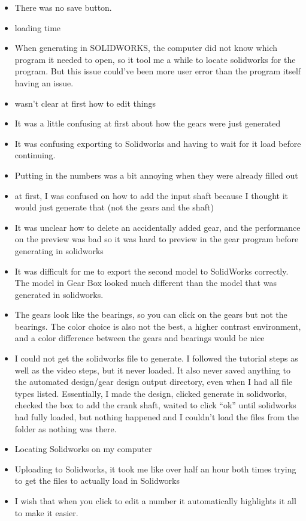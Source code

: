 \begin{itemize}
\item There was no save button.
\item loading time
\item When generating in SOLIDWORKS, the computer did not know which program it needed to open, so it tool me a while to locate solidworks for the program. But this issue could've been more user error than the program itself having an issue.
\item wasn't clear at first how to edit things
\item It was a little confusing at first about how the gears were just generated
\item It was confusing exporting to Solidworks and having to wait for it load before continuing. 
\item Putting in the numbers was a bit annoying when they were already filled out
\item at first, I was confused on how to add the input shaft because I thought it would just generate that (not the gears and the shaft)
\item It was unclear how to delete an accidentally added gear, and the performance on the preview was bad so it was hard to preview in the gear program before generating in solidworks
\item It was difficult for me to export the second model to SolidWorks correctly. The model in Gear Box looked much different than the model that was generated in solidworks. 
\item The gears look like the bearings, so you can click on the gears but not the bearings. The color choice is also not the best, a higher contrast environment, and a color difference between the gears and bearings would be nice
\item I could not get the solidworks file to generate. I followed the tutorial steps as well as the video steps, but it never loaded. It also never saved anything to the automated design/gear design output directory, even when I had all file types listed. Essentially, I made the design, clicked generate in solidworks, checked the box to add the crank shaft, waited to click ``ok'' until solidworks had fully loaded, but nothing happened and I couldn't load the files from the folder as nothing was there.
\item Locating Solidworks on my computer
\item Uploading to Solidworks, it took me like over half an hour both times trying to get the files to actually load in Solidworks
\item I wish that when you click to edit a number it automatically highlights it all to make it easier.

\end{itemize}
